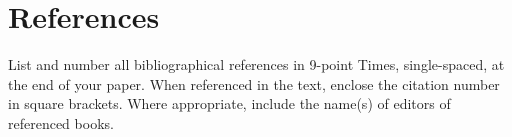 \documentclass[10pt]{article}
\newcommand{\sansserifformat}[1]{\fontfamily{cmss}{ #1}}%
\begin{document}




\section{References} 

List and number all bibliographical references in 9-point Times, single-spaced, at the end of your paper. When referenced in the text, enclose the citation number in square brackets.
Where appropriate, include the name(s) of editors of referenced books.




\end{document}
